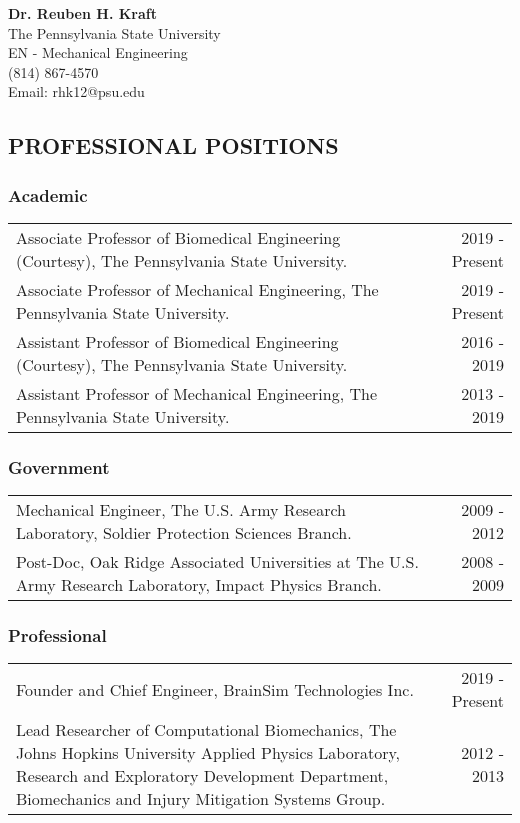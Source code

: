\documentclass[11pt]{article}
\author{}
\date{}
\begin{document}
\textbf{Dr. 
Reuben H. 
Kraft}\\
The Pennsylvania State University\\
EN - Mechanical Engineering\\
(814) 867-4570\\
Email: rhk12@psu.edu

\subsection{PROFESSIONAL POSITIONS}\label{professional-positions}

\subsubsection{Academic}\label{academic}

\begin{tabularx}{\textwidth}{@{}Xr@{}}
Associate Professor of Biomedical Engineering (Courtesy), The Pennsylvania State University. & 2019 - Present \\
\addlinespace[5pt]
Associate Professor of Mechanical Engineering, The Pennsylvania State University. & 2019 - Present \\
\addlinespace[5pt]
Assistant Professor of Biomedical Engineering (Courtesy), The Pennsylvania State University. & 2016 - 2019 \\
\addlinespace[5pt]
Assistant Professor of Mechanical Engineering, The Pennsylvania State University. & 2013 - 2019\end{tabularx}

\subsubsection{Government}\label{government}

\begin{tabularx}{\textwidth}{@{}Xr@{}}
Mechanical Engineer, The U.S. 
Army Research Laboratory, Soldier Protection Sciences Branch. & 2009 - 2012 \\
\addlinespace[5pt]
Post-Doc, Oak Ridge Associated Universities at The U.S. 
Army Research Laboratory, Impact Physics Branch. & 2008 - 2009\end{tabularx}

\subsubsection{Professional}\label{professional}

\begin{tabularx}{\textwidth}{@{}Xr@{}}
Founder and Chief Engineer, BrainSim Technologies Inc. & 2019 - Present \\
\addlinespace[5pt]
Lead Researcher of Computational Biomechanics, The Johns Hopkins University Applied Physics Laboratory, Research and Exploratory Development Department, Biomechanics and Injury Mitigation Systems Group. & 2012 - 2013\end{tabularx}
\end{document}
